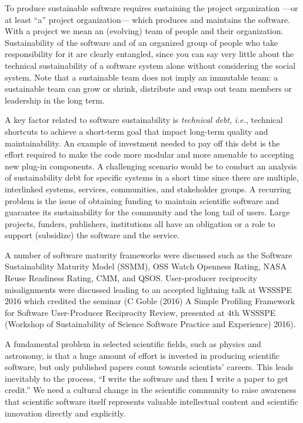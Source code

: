 \documentclass[a4paper,UKenglish]{dagrep}
\newcommand{\ie}{\emph{i.e.},\xspace}
\begin{document}
To produce sustainable software requires sustaining the project organization ---or at least ``a'' project organization--- which produces and maintains the software. With a project we mean an (evolving) team of people and their organization.
Sustainability of the software and of an organized group of people who take responsibility for it are clearly entangled, since you can say very little about the technical sustainability of a software system alone without considering the social system. Note that a sustainable team does not imply an immutable team: a sustainable team can grow or shrink, distribute and swap out team members or leadership in the long term.

A key factor related to software sustainability is \emph{technical debt}, \ie technical shortcuts to achieve a short-term goal that impact long-term quality and maintainability.
An example of investment needed to pay off this debt is the effort required to make the code more modular and more amenable to accepting new plug-in components.
A challenging scenario would be to conduct an analysis of sustainability debt for specific systems in a short time since there are multiple, interlinked systems, services, communities, and stakeholder groups.
A recurring problem is the issue of obtaining funding to maintain scientific software and guarantee its sustainability for the community and the long tail of users. Large projects, funders, publishers, institutions all have an obligation or a role to support (subsidize) the software and the service.

A number of software maturity frameworks were discussed  such as the Software Sustainability Maturity Model (SSMM), OSS Watch Openness Rating, NASA Reuse Readiness Rating, CMM, and QSOS. User-producer reciprocity misalignments were discussed leading to an accepted lightning talk at WSSSPE 2016 which credited the seminar (C Goble (2016) A Simple Profiling Framework for Software User-Producer Reciprocity Review, presented at 4th WSSSPE (Workshop of Sustainability of Science Software Practice and Experience) 2016).



A fundamental problem in selected scientific fields, such as physics and astronomy, is that a huge amount of effort is invested in producing scientific software, but only published papers count towards scientists' careers. This leads inevitably to the process, ``I write the software and then I write a paper to get credit.'' We need a cultural change in the scientific community to raise awareness that scientific software itself represents valuable intellectual content and scientific innovation directly and explicitly.
\end{document}
